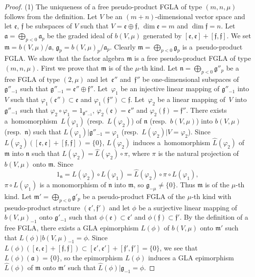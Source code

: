\begin{proof} (1)
The uniqueness of a free pseudo-product FGLA of type $(m,n,\mu)$ follows from the def\/inition.
Let $V$ be an $(m+n)$-dimensional vector space and let
$\mathfrak e$, $\mathfrak f$ be subspaces of $V$
such that $V=\mathfrak e\oplus \mathfrak f$,
$\dim \mathfrak e=m$ and $\dim \mathfrak f=n$.
Let $\mathfrak a=\bigoplus\limits_{p<0}\mathfrak a_p$ be the graded ideal
of $b(V,\mu)$ generated by
$[\mathfrak e,\mathfrak e]+[\mathfrak f,\mathfrak f]$.
We set $\mathfrak m=b(V,\mu)/\mathfrak a$,
$\mathfrak g_p=b(V,\mu)_p/\mathfrak a_p$.
Clearly $\mathfrak m=\bigoplus\limits_{p<0}\mathfrak g_p$ is
a~pseudo-product FGLA.
We show that the factor algebra $\mathfrak m$
is a free pseudo-product FGLA of type $(m,n,\mu)$.
First we prove that $\mathfrak m$ is of the $\mu$-th kind.
Let $\mathfrak n=\bigoplus\limits_{p<0}\mathfrak g''_p$ be
a free FGLA of type $(2,\mu)$ and let~$\mathfrak e''$ and~$\mathfrak f''$
be one-dimensional subspaces of $\mathfrak g''_{-1}$ such that
$\mathfrak g''_{-1}=\mathfrak e''\oplus\mathfrak f''$.
Let~$\varphi_1$ be an injective linear mapping of $\mathfrak g''_{-1}$
into $V$ such that
$\varphi_1(\mathfrak e'')\subset \mathfrak e$ and
$\varphi_1(\mathfrak f'')\subset \mathfrak f$.
Let~$\varphi_2$ be a linear mapping of~$V$
into $\mathfrak g''_{-1}$ such that
$\varphi_2\circ\varphi_1=1_{\mathfrak g''_{-1}}$,
$\varphi_2(\mathfrak e)=\mathfrak e''$ and
$\varphi_2(\mathfrak f)=\mathfrak f''$.
There exists
a~homomorphism~$L(\varphi_1)$ (resp.~$L(\varphi_2)$) of
$\mathfrak n$ (resp.~$b(V,\mu)$) into
$b(V,\mu)$ (resp.~$\mathfrak n$)
such that
$L(\varphi_1)|\mathfrak g''_{-1}=\varphi_1$
(resp.\ $L(\varphi_2)|V=\varphi_2$).
Since $L(\varphi_2)([\mathfrak e,\mathfrak e]+[\mathfrak f,\mathfrak f])=\{0\}$,
$L(\varphi_2)$ induces a~homomorphism $\hat{L}(\varphi_2)$ of
$\mathfrak m$ into $\mathfrak n$ such that
$L(\varphi_2)=\hat{L}(\varphi_2)\circ \pi$,
where $\pi$ is the natural projection of $b(V,\mu)$ onto
$\mathfrak m$. Since
\[
1_{\mathfrak n}=L(\varphi_2)\circ L(\varphi_1)
=\hat{L}(\varphi_2)\circ \pi\circ L(\varphi_1),
\]
$\pi\circ L(\varphi_1)$ is a monomorphism of $\mathfrak n$ into $\mathfrak m$, so $\mathfrak g_{-\mu}\ne\{0\}$.
Thus $\mathfrak m$ is of the $\mu$-th kind.
Let $\mathfrak m'=\bigoplus\limits_{p<0}\mathfrak g'_p$ be a pseudo-product
FGLA of the $\mu$-th kind
with pseudo-product structure $(\mathfrak e',\mathfrak f')$
and let $\phi$ be a surjective linear mapping of $b(V,\mu)_{-1}$ onto
$\mathfrak g'_{-1}$ such that
$\phi(\mathfrak e)\subset\mathfrak e'$ and
$\phi(\mathfrak f)\subset\mathfrak f'$.
By the def\/inition of a free FGLA,
there exists a GLA epimorphism $L(\phi)$ of
$b(V,\mu)$ onto $\mathfrak m'$ such that
$L(\phi)|b(V,\mu)_{-1}=\phi$.
Since $L(\phi)([\mathfrak e,\mathfrak e]+[\mathfrak f,\mathfrak f])\subset [\mathfrak e',\mathfrak e']+[\mathfrak f',\mathfrak f']=\{0\}$,
we see that $L(\phi)(\mathfrak a)=\{0\}$, so
the epimorphism $L(\phi)$ induces a GLA epimorphism
$\hat{L}(\phi)$ of $\mathfrak m$ onto $\mathfrak m'$ such that
$\hat{L}(\phi)|\mathfrak g_{-1}=\phi$.


\end{proof}
